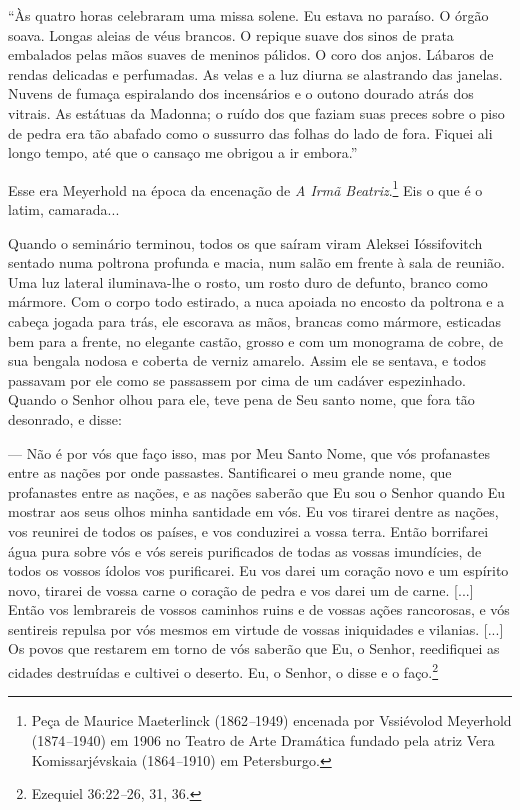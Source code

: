 ``Às quatro horas celebraram uma missa solene. Eu estava no paraíso. O
órgão soava. Longas aleias de véus brancos. O repique suave dos sinos de
prata embalados pelas mãos suaves de meninos pálidos. O coro dos anjos.
Lábaros de rendas delicadas e perfumadas. As velas e a luz diurna se
alastrando das janelas. Nuvens de fumaça espiralando dos incensários e o
outono dourado atrás dos vitrais. As estátuas da Madonna; o ruído dos
que faziam suas preces sobre o piso de pedra era tão abafado como o
sussurro das folhas do lado de fora. Fiquei ali longo tempo, até que o
cansaço me obrigou a ir embora.''

Esse era Meyerhold na época da encenação de \emph{A Irmã
Beatriz}.\footnote{Peça de Maurice Maeterlinck (1862\emph{--}1949)
  encenada por Vssiévolod Meyerhold (1874\emph{--}1940) em 1906 no
  Teatro de Arte Dramática fundado pela atriz Vera Komissarjévskaia
  (1864\emph{--}1910) em Petersburgo.} Eis o que é o latim, camarada...

Quando o seminário terminou, todos os que saíram viram Aleksei
Ióssifovitch sentado numa poltrona profunda e macia, num salão em frente
à sala de reunião. Uma luz lateral iluminava-lhe o rosto, um rosto duro
de defunto, branco como mármore. Com o corpo todo estirado, a nuca
apoiada no encosto da poltrona e a cabeça jogada para trás, ele escorava
as mãos, brancas como mármore, esticadas bem para a frente, no elegante
castão, grosso e com um monograma de cobre, de sua bengala nodosa e
coberta de verniz amarelo. Assim ele se sentava, e todos passavam por
ele como se passassem por cima de um cadáver espezinhado. Quando o
Senhor olhou para ele, teve pena de Seu santo nome, que fora tão
desonrado, e disse:

--- Não é por vós que faço isso, mas por Meu Santo Nome, que vós
profanastes entre as nações por onde passastes. Santificarei o meu
grande nome, que profanastes entre as nações, e as nações saberão que Eu
sou o Senhor quando Eu mostrar aos seus olhos minha santidade em vós. Eu
vos tirarei dentre as nações, vos reunirei de todos os países, e vos
conduzirei a vossa terra. Então borrifarei água pura sobre vós e vós
sereis purificados de todas as vossas imundícies, de todos os vossos
ídolos vos purificarei. Eu vos darei um coração novo e um espírito novo,
tirarei de vossa carne o coração de pedra e vos darei um de carne.
{[}...{]} Então vos lembrareis de vossos caminhos ruins e de vossas
ações rancorosas, e vós sentireis repulsa por vós mesmos em virtude de
vossas iniquidades e vilanias. {[}...{]} Os povos que restarem em torno
de vós saberão que Eu, o Senhor, reedifiquei as cidades destruídas e
cultivei o deserto. Eu, o Senhor, o disse e o faço.\footnote{Ezequiel
  36:22\emph{--}26, 31, 36.}

